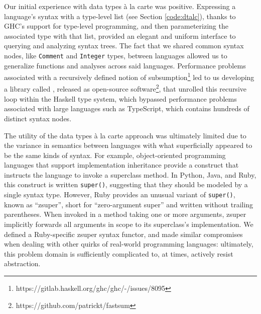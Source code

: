\documentclass[acmsmall,fleqn,12pt]{acmart}
\begin{document}
Our initial experience with data types à la carte was positive. Expressing a
language's syntax with a type-level list (see Section \ref{code:dtalc}),
thanks to GHC's support for type-level programming, and then parameterizing
the associated type with that list, provided an elegant and uniform
interface to querying and analyzing syntax trees. The fact that we shared
common syntax nodes, like \texttt{Comment} and \texttt{Integer} types,
between languages allowed us to generalize functions and analyses across
said languages. Performance problems associated with a recursively defined
notion of subsumption\footnote{https://gitlab.haskell.org/ghc/ghc/-/issues/8095} led to us
developing a library called \fastsum{}, released as open-source
software\footnote{https://github.com/patrickt/fastsum},
that unrolled this recursive loop within the Haskell type system, which bypassed
performance problems associated with large languages such as TypeScript, which
contains hundreds of distinct syntax nodes.

The utility of the data types à la carte approach was ultimately limited due to
the variance in semantics between languages with what superficially appeared to
be the same kinds of syntax. For example, object-oriented programming languages
that support implementation inheritance provide a construct that instructs the
language to invoke a superclass method. In Python, Java, and Ruby, this
construct is written \texttt{super()}, suggesting that they should be modeled by
a single syntax type. However, Ruby provides an unusual variant of
\texttt{super()}, known as “zsuper”, short for “zero-argument super” and written
without trailing parentheses. When invoked in a method taking one or more
arguments, zsuper implicitly forwards all arguments in scope to its superclass’s
implementation. We defined a Ruby-specific zsuper syntax functor, and made
similar compromises when dealing with other quirks of real-world programming
languages: ultimately, this problem domain is sufficiently complicated to, at
times, actively resist abstraction.
\end{document}
